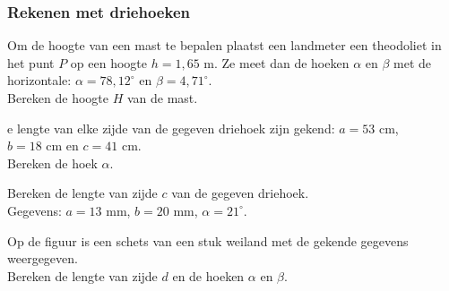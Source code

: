 \subsubsection{Rekenen met driehoeken}

\begin{oef}
Om de hoogte van een mast te bepalen plaatst een landmeter een theodoliet in het punt $P$ op een hoogte $h=1,65$ m. Ze meet dan de hoeken $\alpha$ en $\beta$ met de horizontale: $\alpha=78,12^\circ$ en $\beta=4,71^\circ$.\\
Bereken de hoogte $H$ van de mast.


\end{oef}

\begin{oef}
e lengte van elke zijde van de gegeven driehoek zijn gekend: $a=53$ cm, \\ $b=18$ cm en $c=41$ cm.\\
Bereken de hoek $\alpha$.

\end{oef}

\begin{oef}
Bereken de lengte van zijde $c$ van de gegeven driehoek.\\
Gegevens: $a=13$ mm, $b=20$ mm, $\alpha=21^\circ$. 

\end{oef}

\begin{oef}
	Op de figuur is een schets van een stuk weiland met de gekende gegevens weergegeven. \\
	Bereken de lengte van zijde $d$ en de hoeken $\alpha$ en $\beta$.
	
\end{oef}


